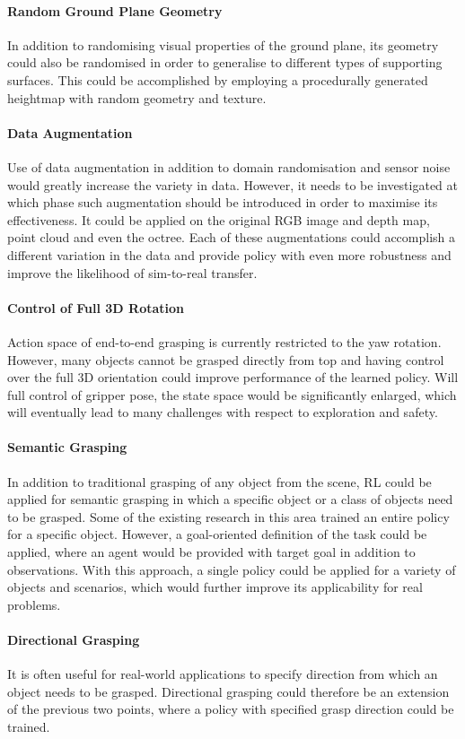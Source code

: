 \paragraph{Random Ground Plane Geometry} In addition to randomising visual properties of the ground plane, its geometry could also be randomised in order to generalise to different types of supporting surfaces. This could be accomplished by employing a procedurally generated heightmap with random geometry and texture.

\paragraph{Data Augmentation} Use of data augmentation in addition to domain randomisation and sensor noise would greatly increase the variety in data. However, it needs to be investigated at which phase such augmentation should be introduced in order to maximise its effectiveness. It could be applied on the original RGB image and depth map, point cloud and even the octree. Each of these augmentations could accomplish a different variation in the data and provide policy with even more robustness and improve the likelihood of sim-to-real transfer.

\paragraph{Control of Full 3D Rotation} Action space of end-to-end grasping is currently restricted to the yaw rotation. However, many objects cannot be grasped directly from top and having control over the full 3D orientation could improve performance of the learned policy. Will full control of gripper pose, the state space would be significantly enlarged, which will eventually lead to many challenges with respect to exploration and safety.

\paragraph{Semantic Grasping} In addition to traditional grasping of any object from the scene, RL could be applied for semantic grasping in which a specific object or a class of objects need to be grasped. Some of the existing research in this area trained an entire policy for a specific object. However, a goal-oriented definition of the task could be applied, where an agent would be provided with target goal in addition to observations. With this approach, a single policy could be applied for a variety of objects and scenarios, which would further improve its applicability for real problems.

\paragraph{Directional Grasping} It is often useful for real-world applications to specify direction from which an object needs to be grasped. Directional grasping could therefore be an extension of the previous two points, where a policy with specified grasp direction could be trained.
